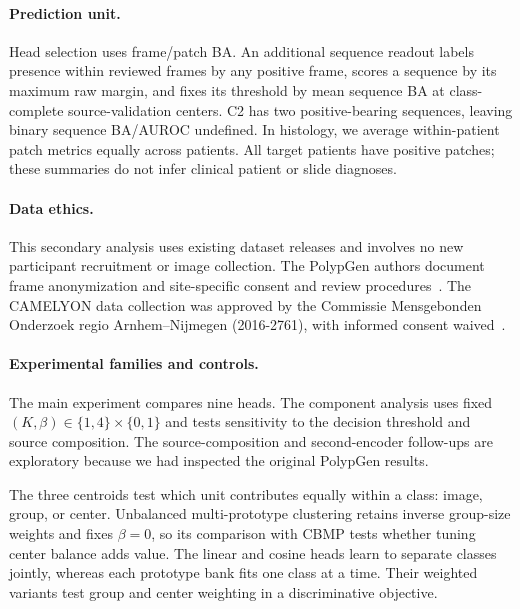 \paragraph{Prediction unit.}
Head selection uses frame/patch BA. An additional sequence readout labels presence within reviewed frames by any positive frame, scores a sequence by its maximum raw margin, and fixes its threshold by mean sequence BA at class-complete source-validation centers. C2 has two positive-bearing sequences, leaving binary sequence BA/AUROC undefined. In histology, we average within-patient patch metrics equally across patients. All target patients have positive patches; these summaries do not infer clinical patient or slide diagnoses.

\paragraph{Data ethics.}
This secondary analysis uses existing dataset releases and involves no new participant recruitment or image collection. The PolypGen authors document frame anonymization and site-specific consent and review procedures~\cite{ali2023polypgen}. The CAMELYON data collection was approved by the Commissie Mensgebonden Onderzoek regio Arnhem--Nijmegen (2016-2761), with informed consent waived~\cite{litjens2018camelyon}.

\paragraph{Experimental families and controls.}
The main experiment compares nine heads. The component analysis uses fixed $(K,\beta)\in\{1,4\}\times\{0,1\}$ and tests sensitivity to the decision threshold and source composition. The source-composition and second-encoder follow-ups are exploratory because we had inspected the original PolypGen results.

The three centroids test which unit contributes equally within a class: image, group, or center. Unbalanced multi-prototype clustering retains inverse group-size weights and fixes $\beta=0$, so its comparison with CBMP tests whether tuning center balance adds value. The linear and cosine heads learn to separate classes jointly, whereas each prototype bank fits one class at a time. Their weighted variants test group and center weighting in a discriminative objective.


